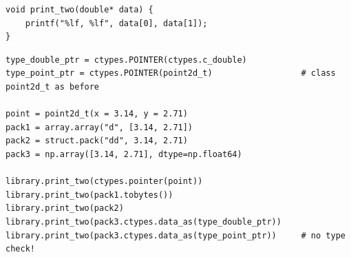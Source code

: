 \begin{frame}[fragile]
%
\begin{codebox}
\begin{verbatim}
void print_two(double* data) {
    printf("%lf, %lf", data[0], data[1]);
}
\end{verbatim}
\end{codebox}
%
\begin{codebox}
\begin{verbatim}
type_double_ptr = ctypes.POINTER(ctypes.c_double)
type_point_ptr = ctypes.POINTER(point2d_t)                  # class point2d_t as before

point = point2d_t(x = 3.14, y = 2.71)
pack1 = array.array("d", [3.14, 2.71])
pack2 = struct.pack("dd", 3.14, 2.71)
pack3 = np.array([3.14, 2.71], dtype=np.float64)

library.print_two(ctypes.pointer(point))
library.print_two(pack1.tobytes())
library.print_two(pack2)
library.print_two(pack3.ctypes.data_as(type_double_ptr))
library.print_two(pack3.ctypes.data_as(type_point_ptr))     # no type check!
\end{verbatim}
\end{codebox}
%
\end{frame}


